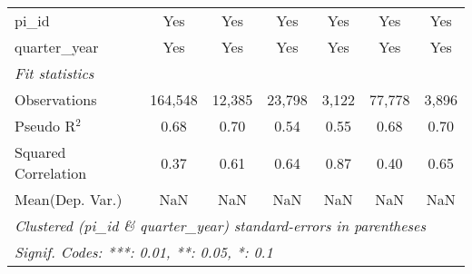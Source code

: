 \begin{tabular}{lcccccc}
   pi\_id                                                     & Yes           & Yes            & Yes          & Yes           & Yes           & Yes\\  
   quarter\_year                                              & Yes           & Yes            & Yes          & Yes           & Yes           & Yes\\  
   \midrule
   \emph{Fit statistics}\\
   Observations                                               & 164,548       & 12,385         & 23,798       & 3,122         & 77,778        & 3,896\\  
   Pseudo R$^2$                                               & 0.68          & 0.70           & 0.54         & 0.55          & 0.68          & 0.70\\  
   Squared Correlation                                        & 0.37          & 0.61           & 0.64         & 0.87          & 0.40          & 0.65\\  
Mean(Dep. Var.) & NaN & NaN & NaN & NaN & NaN & NaN \\
   \midrule \midrule
   \multicolumn{7}{l}{\emph{Clustered (pi\_id \& quarter\_year) standard-errors in parentheses}}\\
   \multicolumn{7}{l}{\emph{Signif. Codes: ***: 0.01, **: 0.05, *: 0.1}}\\
\end{tabular}
\par\endgroup
